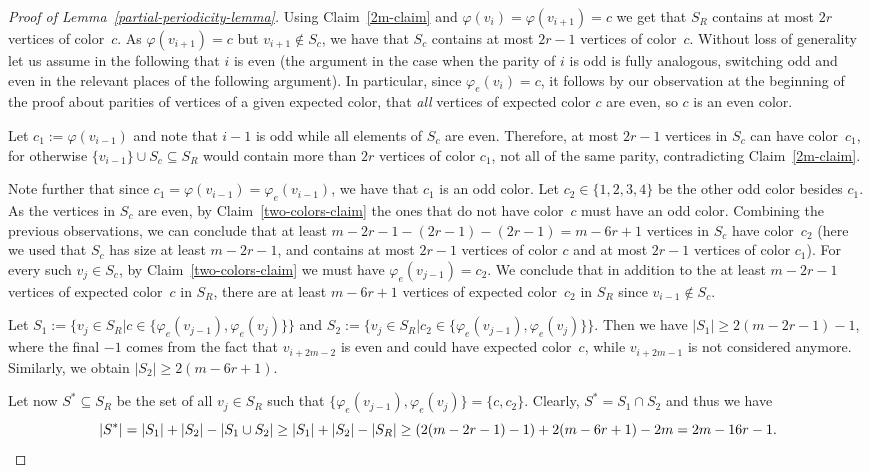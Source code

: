 \documentclass[a4paper,10pt,hidelinks]{amsart}
\renewcommand{\phi}{\ensuremath{\varphi}}
\theoremstyle{definition}
\begin{document}
\begin{proof}[Proof of Lemma~\ref{partial-periodicity-lemma}]
    Using Claim~\ref{2m-claim} and $\varphi(v_i) = \varphi(v_{i + 1}) = c$  we get that $S_R$ contains at most $2r$ vertices of color~$c$. As $\phi(v_{i+1})=c$ but $v_{i+1} \notin S_c$, we have that $S_c$ contains at most $2r - 1$ vertices of color~$c$. Without loss of generality let us assume in the following that $i$ is even (the argument in the case when the parity of $i$ is odd is fully analogous, switching odd and even in the relevant places of the following argument). In particular, since $\phi_e(v_{i})=c$, it follows by our observation at the beginning of the proof about parities of vertices of a given expected color, that \emph{all} vertices of expected color $c$ are even, so $c$ is an even color.
    
    Let $c_1 := \varphi(v_{i - 1})$ and note that $i - 1$ is odd while all elements of $S_c$ are even. Therefore, at most $2r - 1$ vertices in $S_c $ can have color~$c_1$, for otherwise $\{v_{i-1}\}\cup S_c\subseteq S_R$ would contain more than $2r$ vertices of color $c_1$, not all of the same parity, contradicting Claim~\ref{2m-claim}. 
    
    Note further that since $c_1=\phi(v_{i-1})=\phi_e(v_{i-1})$, we have that $c_1$ is an odd color. Let $c_2 \in \{1,2,3,4\}$ be the other odd color besides $c_1$. As the vertices in $S_c$ are even, by Claim~\ref{two-colors-claim} the ones that do not have color~$c$ must have an odd color. Combining the previous observations, we can conclude that at least $m - 2r - 1 - (2r - 1) - (2r - 1) = m - 6r + 1$ vertices in $S_c$ have color~$c_2$ (here we used that $S_c$ has size at least $m-2r-1$, and contains at most $2r-1$ vertices of color $c$ and at most $2r-1$ vertices of color $c_1$). For every such $v_j \in S_c$, by Claim~\ref{two-colors-claim} we must have $\varphi_e(v_{j - 1}) = c_2$. We conclude that in addition to the at least $m - 2r - 1$ vertices of expected color~$c$ in $S_R$, there are at least $m - 6r + 1$ vertices of expected color~$c_2$ in $S_R$ since $v_{i - 1} \notin S_c$.

    Let $S_1:=\{v_j\in S_R|c \in \{\varphi_e(v_{j - 1}), \varphi_e(v_j)\}\}$ and $S_2:=\{v_j\in S_R|c_2 \in \{\varphi_e(v_{j - 1}), \varphi_e(v_j)\}\}$. Then we have $|S_1|\ge 2(m - 2r - 1) - 1$, where the final $-1$ comes from the fact that $v_{i + 2m - 2}$ is even and could have expected color~$c$, while $v_{i + 2m - 1}$ is not considered anymore. Similarly, we obtain  $|S_2|\ge 2(m - 6r + 1)$.

    Let now $S^\ast \subseteq S_R$ be the set of all $v_j\in S_R$ such that $\{\varphi_e(v_{j - 1}), \varphi_e(v_j)\} = \{c, c_2\}$. Clearly, $S^\ast=S_1\cap S_2$ and thus we have \begin{equation}\notag
    |S^\ast|=|S_1|+|S_2|-|S_1\cup S_2|\ge |S_1|+|S_2|-|S_R|\ge  (2(m-2r-1)-1)+2(m-6r+1)-2m = 2m - 16r - 1.\end{equation}


\end{proof}
\end{document}
